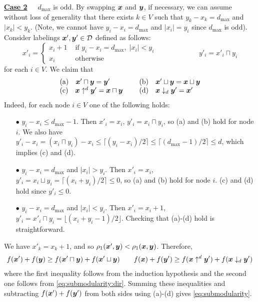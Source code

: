 \documentclass[11pt,onecolumn]{article}
\newcommand{\myparagraph}[1]{{\vspace*{2pt}\noindent\bf{#1}~~}}
\def\D{{\cal D}}
\newcommand{\bx}{\mbox{\boldmath $x$}}
\newcommand{\by}{\mbox{\boldmath $y$}}
\begin{document}
\myparagraph{\underline{Case 2}} $d_{\max}$ is odd.
By swapping $\bx$ and $\by$, if necessary, we can assume without loss of generality that there exists $k\in V$ such that $y_k-x_k=d_{\max}$ and
$|x_k|<y_k$. (Note, we cannot have $y_i-x_i=d_{\max}$ and $|x_i|=y_i$ since $d_{\max}$ is odd).
Consider labelings $\bx',\by'\in\D$ defined as follows:
\begin{equation*}
x'_i  =  \begin{cases}
x_i+1 & \mbox{ if~} y_i-x_i=d_{\max}, \; |x_i| < y_i \\
x_i   & \mbox{ otherwise}
\end{cases}
 \qquad\qquad\qquad
y'_i  =  x'_i \sqcap y_i
\end{equation*}
for each $i\in V$. We claim that
\begin{equation*}
\begin{tabular}{ll}
(a)$\quad \bx' \sqcap \by = \by' \qquad \quad  $ &
(b)$\quad \bx' \sqcup \by = \bx \sqcup \by $ \\
(c)$\quad \bx \uparrow^{d} \by' =  \bx \sqcap \by $ &
(d)$\quad \bx \downarrow_{d} \by' = \bx'$
\end{tabular}
\end{equation*}
Indeed, for each node $i\in V$ one of the following holds:
\begin{itemize}
\item[$\bullet$] $y_i-x_i\le d_{\max}-1$. Then $x'_i=x_i$, $y'_i=x_i \sqcap y_i$, so (a) and (b) hold for node $i$.
We also have $y'_i - x_i = (x_i\sqcap y_i)-x_i \le \lceil (y_i - x_i)/2 \rceil \le \lceil (d_{\max}-1)/2 \rceil \le d$,
which implies (c) and (d).
\item[$\bullet$] $y_i-x_i=d_{\max}$ and $|x_i|>y_i$. Then $x'_i=x_i$, $y'_i=x_i \sqcup y_i=\lceil(x_i+y_i)/2\rceil\le 0$,
so (a) and (b) hold for node $i$.
(c) and (d) hold since $y'_i\le 0$.
\item[$\bullet$] $y_i-x_i=d_{\max}$ and $|x_i|<y_i$. Then $x'_i=x_i+1$,
$y'_i = x'_i \sqcap y_i = \lfloor(x_i+y_i-1)/2\rfloor$.
Checking that (a)-(d) hold is straightforward.
\end{itemize}
We have $x'_k=x_k+1$, and so $\rho_1(\bx',\by)<\rho_1(\bx,\by)$. Therefore, 
\begin{eqnarray*}
f(\bx')+f(\by) \ge  f(\bx' \sqcap \by) + f(\bx' \sqcup \by) & \quad &
f(\bx)+f(\by') \ge  f(\bx \uparrow^{d} \by') + f(\bx \downarrow_{d} \by')
\end{eqnarray*}
where the first inequality follows from the induction hypothesis and the second one follows from \eqref{eq:submodularity:dir}.
Summing these inequalities and subtracting $f(\bx')+f(\by')$ from both sides using (a)-(d) gives \eqref{eq:submodularity}.
\end{document}
